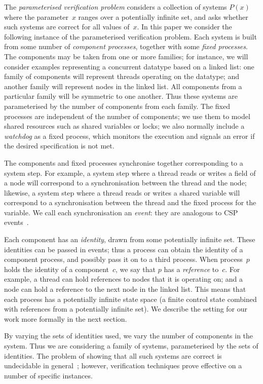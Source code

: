 The \emph{parameterised verification problem} considers a collection of
systems $P(x)$ where the parameter~$x$ ranges over a potentially infinite set,
and asks whether such systems are correct for all values of~$x$.  In this
paper we consider the following instance of the parameterised verification
problem.  Each system is built from some number of \emph{component processes},
together with some \emph{fixed processes}.  The components may be taken from
one or more families; for instance, we will consider examples representing a
concurrent datatype based on a linked list: one family of components will
represent threads operating on the datatype; and another family will represent
nodes in the linked list.  All components from a particular family will be
symmetric to one another.  Thus these systems are parameterised by the number
of components from each family.  The fixed processes are independent
of the number of components; we use them to model shared resources such as
shared variables or locks; we also normally include a \emph{watchdog} as a
fixed process, which monitors the execution and signals an error if the
desired specification is not met.

The components and fixed processes synchronise together corresponding to a
system step.  For example, a system step where a thread reads or writes a
field of a node will correspond to a synchronisation between the thread and
the node; likewise, a system step where a thread reads or writes a shared
variable will correspond to a synchronisation between the thread and the fixed
process for the variable.  We call each synchronisation an \emph{event}: they
are analogous to CSP events~\cite{awr:UCS}.

Each component has an \emph{identity}, drawn from some potentially infinite
set.  These identities can be passed in events; thus a process can obtain the
identity of a component process, and possibly pass it on to a third process.
When process~$p$ holds the identity of a component~$c$, we say that $p$ has a
\emph{reference} to~$c$.  For example, a thread can hold references to nodes
that it is operating on; and a node can hold a reference to the next node in
the linked list.  This means that each process has a potentially infinite
state space (a finite control state combined with references from a
potentially infinite set).  We describe the setting for our work more formally
in the next section.

By varying the sets of identities used, we vary the number of components in the
system.  Thus we are considering a family of systems, parameterised by the
sets of identities.  The problem of showing that all such systems are
correct is undecidable in general~\cite{apt-kozen,tomasz-gavin-CA}; however,
verification techniques prove effective on a number of specific instances.

